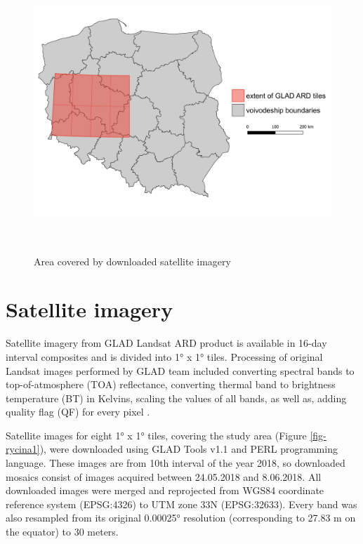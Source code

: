 \documentclass{amuthesis}
\begin{document}
\begin{figure}[H]

{\centering \includegraphics[width=5.875in,height=4.16667in]{./figures/study_area.png}

}

\caption{\label{fig-rycina2}Area covered by downloaded satellite
imagery}

\end{figure}

\hypertarget{sec-sat}{%
\section{Satellite imagery}\label{sec-sat}}

Satellite imagery from GLAD Landsat ARD product is available in 16-day
interval composites and is divided into 1° x 1° tiles. Processing of
original Landsat images performed by GLAD team included converting
spectral bands to top-of-atmosphere (TOA) reflectance, converting
thermal band to brightness temperature (BT) in Kelvins, scaling the
values of all bands, as well as, adding quality flag (QF) for every
pixel \autocite{potapov_landsat_2020}.

Satellite images for eight 1° x 1° tiles, covering the study area
(Figure \ref{fig-rycina1}), were downloaded using GLAD Tools v1.1 and
PERL programming language. These images are from 10th interval of the
year 2018, so downloaded mosaics consist of images acquired between
24.05.2018 and 8.06.2018. All downloaded images were merged and
reprojected from WGS84 coordinate reference system (EPSG:4326) to UTM
zone 33N (EPSG:32633). Every band was also resampled from its original
0.00025° resolution (corresponding to 27.83 m on the equator) to 30
meters.
\end{document}
